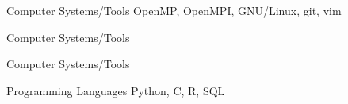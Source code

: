 

\begin{cvskills}

  \cvskill
    {Computer Systems/Tools}
    {OpenMP, OpenMPI, GNU/Linux, git, vim}

  \cvskill
    {Computer Systems/Tools}
	{}

  \cvskill
	{\hspace{-10.0mm}}
    {Computer Systems/Tools}


  \cvskill
    {Programming Languages} %
    {Python, C, R, SQL}

\end{cvskills}
